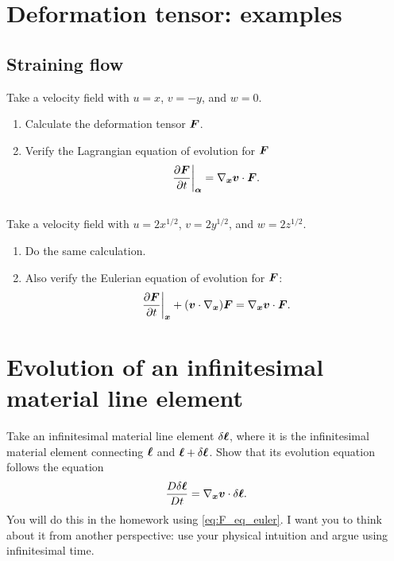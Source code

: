 \documentclass[11pt,letterpaper]{report}
\begin{document}

\section{Deformation tensor: examples}
\subsection{Straining flow}
Take a velocity field with $u=x$, $v=-y$, and $w=0$. 
\begin{enumerate}
    \item Calculate the deformation tensor $\boldsymbol{F}$.
    \item Verify the Lagrangian equation of evolution for $\boldsymbol{F}$
        \begin{align}
            \left.\frac{\partial\boldsymbol{F}}{\partial t}\right|_{\boldsymbol{\alpha}} = \nabla_{\boldsymbol{x}}\boldsymbol{v}\cdot \boldsymbol{F}.
        \end{align}
\end{enumerate}

\subsection{}
Take a velocity field with $u=2x^{1/2}$, $v=2y^{1/2}$, and $w=2z^{1/2}$. 
\begin{enumerate}
    \item Do the same calculation.
    \item Also verify the Eulerian equation of evolution for $\boldsymbol{F}$:
        \begin{align}
            \left.\frac{\partial\boldsymbol{F}}{\partial t}\right|_{\boldsymbol{x}}+(\boldsymbol{v}\cdot\nabla_{\boldsymbol{x}})\boldsymbol{F} = \nabla_{\boldsymbol{x}}\boldsymbol{v}\cdot \boldsymbol{F}.\label{eq:F_eq_euler}
        \end{align}
\end{enumerate}

\section{Evolution of an infinitesimal material line element}
Take an infinitesimal material line element $\delta\boldsymbol{\ell}$, where it is the
infinitesimal material element connecting $\boldsymbol{\ell}$ and $\boldsymbol{\ell}+\delta\boldsymbol{\ell}$. Show that its evolution equation follows the equation
\begin{align}
    \frac{D\delta\boldsymbol{\ell}}{Dt}=\nabla_{\boldsymbol{x}}\boldsymbol{v}\cdot \delta\boldsymbol{\ell}.
\end{align}
You will do this in the homework using \eqref{eq:F_eq_euler}. I want you to think about it from another perspective: use your physical intuition and argue using infinitesimal time. 
\end{document}
